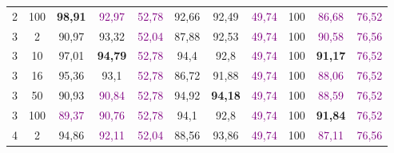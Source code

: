 \begin{table}[ht]
\begin{tabular}{cc|ccc|ccc|ccc}
        {2}                           & {100}   & \textbf{98,91}                      & \textcolor{purple}{92,97}           & \textcolor{purple}{52,78}                & {92,66}                         & {92,49}                         & \textcolor{purple}{49,74}      & {100}                           & \textcolor{purple}{86,68}       & \textcolor{purple}{76,52}      \\
        {3}                           & {2}     & {90,97}                             & {93,32}                             & \textcolor{purple}{52,04}                & {87,88}                         & {92,53}                         & \textcolor{purple}{49,74}      & {100}                           & \textcolor{purple}{90,58}       & \textcolor{purple}{76,56}      \\
        {3}                           & {10}    & {97,01}                             & \textbf{{94,79}}                    & \textcolor{purple}{52,78}                & {94,4}                          & {92,8}                          & \textcolor{purple}{49,74}      & {100}                           & \textbf{91,17}                  & \textcolor{purple}{76,52}      \\
        {3}                           & {16}    & {95,36}                             & {93,1}                              & \textcolor{purple}{52,78}                & {86,72}                         & {91,88}                         & \textcolor{purple}{49,74}      & {100}                           & \textcolor{purple}{88,06}       & \textcolor{purple}{76,52}      \\
        {3}                           & {50}    & {90,93}                             & \textcolor{purple}{90,84}           & \textcolor{purple}{52,78}                & {94,92}                         & \textbf{94,18}                  & \textcolor{purple}{49,74}      & {100}                           & \textcolor{purple}{88,59}       & \textcolor{purple}{76,52}      \\
        {3}                           & {100}   & \textcolor{purple}{89,37}           & \textcolor{purple}{90,76}           & \textcolor{purple}{52,78}                & {94,1}                          & {92,8}                          & \textcolor{purple}{49,74}      & {100}                           & \textbf{91,84}                  & \textcolor{purple}{76,52}      \\
        {4}                           & {2}     & {94,86}                             & \textcolor{purple}{92,11}           & \textcolor{purple}{52,04}                & {88,56}                         & {93,86}                         & \textcolor{purple}{49,74}      & {100}                           & \textcolor{purple}{87,11}       & \textcolor{purple}{76,56}      \\

\end{tabular}
\end{table}
